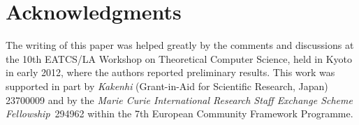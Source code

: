\section*{Acknowledgments}

The writing of this paper was 
helped greatly by the comments and discussions at the 
10th EATCS/LA Workshop on Theoretical Computer Science, 
held in Kyoto in early 2012, 
where the authors reported preliminary results. 
This work was supported in part 
by \emph{Kakenhi} (Grant-in-Aid for Scientific Research, Japan) 23700009 
and by the \emph{Marie Curie International Research
Staff Exchange Scheme Fellowship}~294962
within the 7th European Community Framework Programme. 

